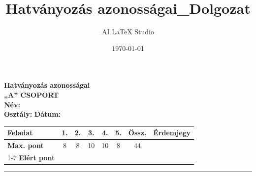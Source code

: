 \documentclass[11pt,a4paper]{article}
\title{Hatványozás azonosságai_Dolgozat}
\author{AI LaTeX Studio}
\date{\today}
\begin{document}

\noindent
\begin{minipage}[t]{0.45\textwidth}
  \vspace{0pt}
  
  {\Large\textbf{Hatványozás azonosságai}}\\[2mm]
  {\large\textbf{„A” CSOPORT}}\\[2mm]
  \textbf{Név:} \underline{\hspace{4.5cm}}\\[2mm]
  \textbf{Osztály:} \underline{\hspace{1.5cm}} \quad \textbf{Dátum:} \underline{\hspace{2cm}}
\end{minipage}
\hfill
\begin{minipage}[t]{0.53\textwidth}
  \vspace{0pt}
  \begin{flushright}
  {\small
  \begin{tabular}{|l|c|c|c|c|c||c||c|}
    \hline
    \textbf{Feladat} & 1. & 2. & 3. & 4. & 5. & \textbf{Össz.} & \textbf{Érdemjegy} \\ \hline
    \textbf{Max. pont} & 8 & 8 & 10 & 10 & 8 & 44 & \\ \cline{1-7}
    \textbf{Elért pont} &  &  &  &  &  &  &  \\ \hline
  \end{tabular}
  }
  \end{flushright}
\end{minipage}
\vspace{2mm}
\hrule
\vspace{4mm}
\end{document}
